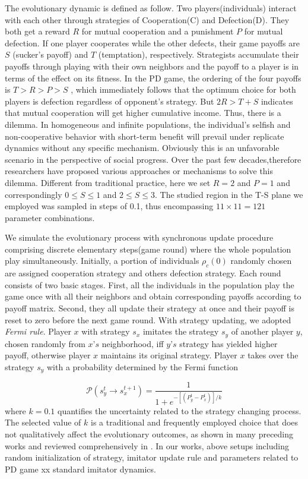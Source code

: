 \documentclass[preprint,12pt,3p]{elsarticle}
\begin{document}
\label{game model}
    The evolutionary dynamic is defined as follow.
Two players(individuals) interact with each other through strategies of Cooperation(C) and Defection(D).
They both get a reward $R$ for mutual cooperation and a punishment $P$ for mutual defection.
If one player cooperates while the other defects, their game payoffs are $S$
(sucker's payoff) and $T$ (temptation), respectively.
Strategists accumulate their payoffs through playing with their own neighbors and the payoff
to a player is in terms of the effect on its fitness.
In the PD game, the ordering of the four payoffs is $T > R > P > S$ , which immediately follows
that the optimum choice for both players is defection regardless of opponent's strategy.
But $2R > T+S$ indicates that mutual cooperation will get higher cumulative income.
Thus, there is a dilemma.
    In homogeneous and infinite populations, the individual's selfish and non-cooperative behavior
with short-term benefit will prevail under replicate dynamics  without any specific mechanism.
Obviously this is an unfavorable scenario in the perspective of social progress.
\label{sovle dilemma}Over the past few decades,therefore researchers have proposed various
approaches or mechanisms to solve this dilemma.
Different from traditional practice, here we set $R=2$ and $P=1$ and
correspondingly $0\leq S \leq1$ and $2\leq S \leq3$.
The studied region in the T-S plane we employed was sampled in steps of 0.1,
thus encompassing $11 \times 11=121$ parameter combinations.

    We simulate the evolutionary process with synchronous update procedure comprising
discrete elementary steps(game round) where the whole population play simultaneously.
Initially, a portion of individuals $\rho_{c}(0)$ randomly chosen are assigned cooperation strategy and others defection strategy.
Each round consists of two basic stages.
First, all the individuals in the population play the game once with all their neighbors and obtain
corresponding payoffs according to payoff matrix.
Second, they all update their strategy at once and their payoff is reset to zero before the next
game round.
With strategy updating, we adopted \textit{Fermi rule}\cite{SzabóTőke-18257}.
Player $x$ with strategy $s_x$ imitates the strategy $s_y$ of another player $y$,
chosen randomly from $x’s$ neighborhood, iff $y’s$ strategy has yielded higher payoff,
otherwise player $x$ maintains its original strategy.
Player $x$ takes over the strategy $s_y$  with a probability determined by
the Fermi function

\begin{equation}
\mathcal{P}(s_y^t\rightarrow s_x^{t+1})=\frac{1}{1+e^{-[(P_y^t-P_x^t)]/k}}
\end{equation}
where $k=0.1$ quantifies the uncertainty related to the strategy changing process.
The selected value of $k$ is a traditional and frequently employed choice that does
not qualitatively affect the evolutionary outcomes, as shown in many preceding
works and reviewed comprehensively in \cite{szabo2007evolutionary,wang2014degree}.
In our works, above setups including random initialization of strategy, imitator update rule and parameters
related to PD game xx standard imitator dynamics.
\end{document}
